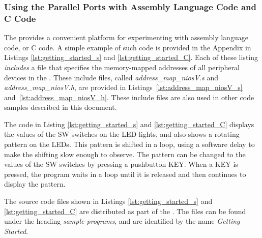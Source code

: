 \subsubsection{Using the Parallel Ports with Assembly Language Code and C Code}

The {\it \systemNameFull} provides a convenient platform for experimenting with {\processor}
assembly language code, or C code.  A simple example of such code is provided in the Appendix in
Listings \ref{lst:getting_started_s} and \ref{lst:getting_started_C}. Each of these
listing {\it includes} a file that specifies the memory-mapped addresses of all peripheral
devices in the {\it \systemNameFull}. These include files, called {\it address\_map\_niosV.s}
and {\it address\_map\_niosV.h}, are provided in Listings~\ref{lst:address_map_niosV_s}
and~\ref{lst:address_map_niosV_h}. These include files are also used in other code
samples described in this document.  

The code in Listing \ref{lst:getting_started_s} and \ref{lst:getting_started_C}
displays the values of the SW switches on the LED lights, and also
shows a rotating pattern on the LEDs. This pattern is shifted in a loop, using a software delay
to make the shifting slow enough to observe. The pattern can be changed to the values of the 
SW switches by pressing a pushbutton KEY. When a KEY is pressed, the program waits in a
loop until it is released and then continues to display the pattern.

The source code files shown in Listings \ref{lst:getting_started_s} and \ref{lst:getting_started_C}
are distributed as part of the  
\productNameMed{}. The files can be found under the heading {\it sample programs}, 
and are identified by the name {\it Getting Started}.



